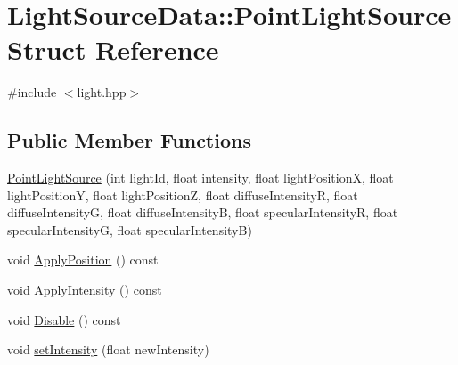 \hypertarget{struct_light_source_data_1_1_point_light_source}{}\section{Light\+Source\+Data\+:\+:Point\+Light\+Source Struct Reference}
\label{struct_light_source_data_1_1_point_light_source}


{\ttfamily \#include $<$light.\+hpp$>$}

\subsection*{Public Member Functions}
\begin{DoxyCompactItemize}
\item 
\hyperlink{struct_light_source_data_1_1_point_light_source_abcf0248c30097a775fee01fac024c69f}{Point\+Light\+Source} (int light\+Id, float intensity, float light\+PositionX, float light\+PositionY, float light\+PositionZ, float diffuse\+IntensityR, float diffuse\+IntensityG, float diffuse\+IntensityB, float specular\+IntensityR, float specular\+IntensityG, float specular\+IntensityB)
\item 
void \hyperlink{struct_light_source_data_1_1_point_light_source_a282a80169cee9f93ce61517463ec1599}{Apply\+Position} () const 
\item 
void \hyperlink{struct_light_source_data_1_1_point_light_source_a1e3f2921341e5c76d5e6a7c86806518e}{Apply\+Intensity} () const 
\item 
void \hyperlink{struct_light_source_data_1_1_point_light_source_aaf6c53acb771b0d12d9eb7170a32768a}{Disable} () const 
\item 
void \hyperlink{struct_light_source_data_1_1_point_light_source_a5ed61c49ceb54686c205b91a3673378e}{set\+Intensity} (float new\+Intensity)
\end{DoxyCompactItemize}
